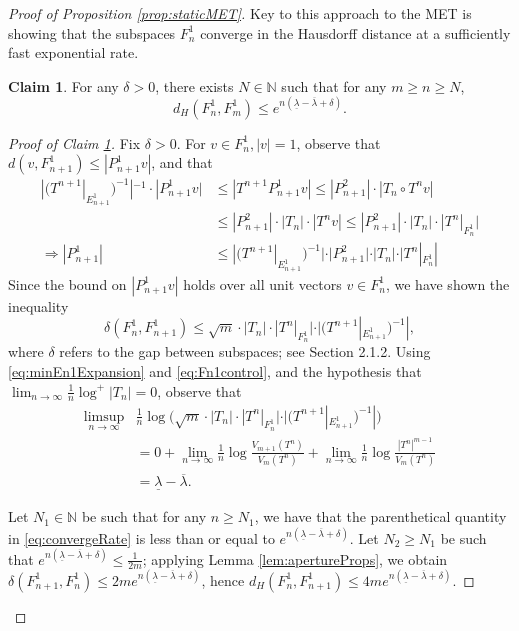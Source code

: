 \documentclass[11pt]{amsart}
\theoremstyle{theorem}
\theoremstyle{definition}
\newtheorem{cla}[thm]{Claim}
\numberwithin{equation}{section}
\newcommand{\N}{\mathbb{N}}
\renewcommand{\d}{\delta}
\newcommand{\ol}{\overline{\lambda}}
\newcommand{\ul}{\underline{\lambda}}
\begin{document}
\begin{proof}[Proof of Proposition \ref{prop:staticMET}]
Key to this approach to the MET is showing that the subspaces $F_n^1$ converge in the Hausdorff distance at a sufficiently fast exponential rate.
\begin{cla} \label{cla:slowSpaceCauchy}
For any $\d > 0$, there exists $N \in \N$ such that for any $m \geq n  \geq N$,
\[
d_H(F_n^1, F_m^1) \leq e^{n (\ul - \ol + \d)}.
\]
\end{cla}

\begin{proof}[Proof of Claim \ref{cla:slowSpaceCauchy}]

Fix $\d > 0$.  For $v \in F_n^1, |v| = 1$, observe that $d(v, F_{n + 1}^1) \leq | P_{n + 1}^1 v|$, and that
\begin{align}
|(T^{n + 1}|_{E_{n + 1}^1})^{-1}|^{-1} \cdot |P_{n + 1}^1 v| &\leq |T^{n + 1} P_{n + 1}^1 v| \leq |P_{n + 1}^2| \cdot |T_n \circ T^n v| \nonumber \\
& \leq |P_{n +1}^2| \cdot |T_n| \cdot |T^n v| \leq |P_{n + 1}^2| \cdot |T_n| \cdot |T^n|_{F_n^1}| \nonumber \\
\Rightarrow |P^1_{n+1}| &\leq |(T^{n+1}|_{E_{n+1}^1})^{-1}| \cdot |P_{n+1}^2| \cdot |T_n| \cdot |T^n|_{F_n^1}|
\end{align}
Since the bound on $|P_{n+1}^1 v|$ holds over all unit vectors $v \in F_n^1$, we have shown the inequality
\[
\d(F_n^1, F_{n + 1}^1) \leq \sqrt{m} \cdot |T_n| \cdot |T^n|_{F_n^1}| \cdot |(T^{n + 1}|_{E_{n + 1}^1})^{-1}|,
\]
where $\d$ refers to the gap between subspaces; see Section 2.1.2. Using \eqref{eq:minEn1Expansion} and \eqref{eq:Fn1control}, and the hypothesis that $\lim_{n \to \infty} \frac{1}{n} \log^+ |T_n| = 0$, observe that
\begin{align} \label{eq:convergeRate}
\limsup_{n \to \infty} &\frac{1}{n} \log \bigg( \sqrt{m} \cdot |T_n| \cdot |T^n|_{F_n^1}| \cdot |(T^{n + 1}|_{E_{n + 1}^1})^{-1}| \bigg)  \\
& = 0 + \lim_{n \to \infty} \frac{1}{n} \log \frac{V_{m + 1}(T^n)}{V_m(T^n)} + \lim_{n \to \infty} \frac{1}{n} \log \frac{|T^n|^{m-1}}{V_m(T^n)} \nonumber\\
& = \ul - \ol. \nonumber
\end{align}

Let $N_1 \in \N$ be such that for any $n \geq N_1$, we have that the parenthetical quantity in \eqref{eq:convergeRate} is less than or equal to $e^{n (\ul - \ol + \d)}$. Let $N_2 \geq N_1$ be such that $e^{n (\ul - \ol + \d)} \leq \frac{1}{2 m}$; applying Lemma \ref{lem:apertureProps}, we obtain $\d(F_{n + 1}^1, F_n^1) \leq 2 m e^{n (\ul - \ol + \d)}$, hence $d_H(F_n^1, F_{n + 1}^1) \leq 4 m e^{n (\ul - \ol + \d)} $.



\end{proof}
\end{proof}
\end{document}
